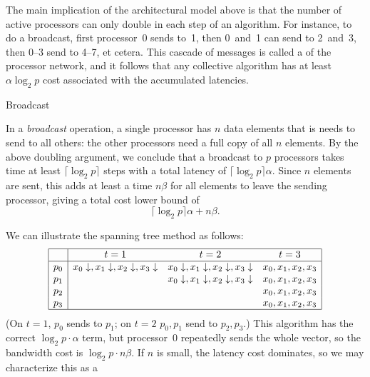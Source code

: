 The main implication of the architectural model above is that the
number of active processors can only double in each step of an
algorithm. For instance, to do a broadcast, first processor~0 sends
to~1, then 0~and~1 can send to 2~and~3, then 0--3 send to 4--7, et
cetera. This cascade of messages is called
a  of the processor network, and
it follows that any collective algorithm has at least $\alpha\log_2p$
cost associated with the accumulated latencies.

 {Broadcast}

In a \emph{broadcast} operation, a single processor has $n$ data elements
that is needs to send to all others: the other processors need a full
copy of all $n$ elements.  By
the above doubling argument, we conclude that a broadcast to $p$
processors takes time at least $\lceil\log_2 p\rceil$ steps with a
total latency of $\lceil\log_2 p\rceil \alpha$. Since $n$ elements are
sent, this adds at least a time $n\beta$ for all elements to leave the
sending processor, giving a total cost lower bound of
\[ \lceil\log_2 p\rceil \alpha+n\beta. \]

We can illustrate the spanning tree method as follows:
\[
\begin{array}{|c|ccc|}
\hline
  &t=1&t=2&t=3\\ \hline
p_0&x_0\downarrow,x_1\downarrow,x_2\downarrow,x_3\downarrow
   &x_0\downarrow,x_1\downarrow,x_2\downarrow,x_3\downarrow
   &x_0,x_1,x_2,x_3\\
p_1&&x_0\downarrow,x_1\downarrow,x_2\downarrow,x_3\downarrow
   &x_0,x_1,x_2,x_3\\
p_2&&&x_0,x_1,x_2,x_3\\
p_3&&&x_0,x_1,x_2,x_3\\
\hline
\end{array}
\]
(On $t=1$, $p_0$ sends to $p_1$; on $t=2$ $p_0,p_1$ send to $p_2,p_3$.)
This algorithm has the correct $\log_2p\cdot\alpha$ term, but processor~0 repeatedly
sends the whole vector, so the bandwidth cost is $\log_2p\cdot n\beta$.
If $n$ is small, the latency cost dominates, so we may characterize this 
as a 

